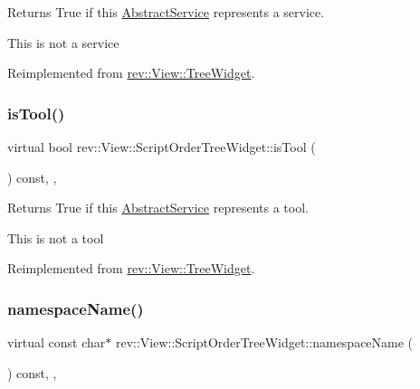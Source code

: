 Returns True if this \mbox{\hyperlink{classrev_1_1_abstract_service}{Abstract\+Service}} represents a service. 

This is not a service 

Reimplemented from \mbox{\hyperlink{classrev_1_1_view_1_1_tree_widget_a9f10e939850acf8fce1992b5b9b3fc24}{rev\+::\+View\+::\+Tree\+Widget}}.

\mbox{\label{classrev_1_1_view_1_1_script_order_tree_widget_af9f5bd25d83e76ee06855074cbd1c265}} 
\subsubsection{\texorpdfstring{isTool()}{isTool()}}
{\footnotesize\ttfamily virtual bool rev\+::\+View\+::\+Script\+Order\+Tree\+Widget\+::is\+Tool (\begin{DoxyParamCaption}{ }\end{DoxyParamCaption}) const\hspace{0.3cm}{\ttfamily [inline]}, {\ttfamily [override]}, {\ttfamily [virtual]}}



Returns True if this \mbox{\hyperlink{classrev_1_1_abstract_service}{Abstract\+Service}} represents a tool. 

This is not a tool 

Reimplemented from \mbox{\hyperlink{classrev_1_1_view_1_1_tree_widget_a7ff55c9e8c83c70e9331a7fe7acafbb6}{rev\+::\+View\+::\+Tree\+Widget}}.

\mbox{\label{classrev_1_1_view_1_1_script_order_tree_widget_aeffcb37cdb2f9745d92b74c0ed73aebd}} 
\subsubsection{\texorpdfstring{namespaceName()}{namespaceName()}}
{\footnotesize\ttfamily virtual const char$\ast$ rev\+::\+View\+::\+Script\+Order\+Tree\+Widget\+::namespace\+Name (\begin{DoxyParamCaption}{ }\end{DoxyParamCaption}) const\hspace{0.3cm}{\ttfamily [inline]}, {\ttfamily [override]}, {\ttfamily [virtual]}}



